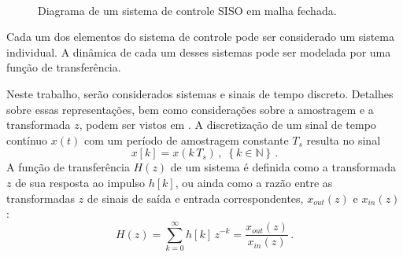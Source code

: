 \documentclass[repeatfields,oneside]{tcc}
\newcommand{\mycdot}{ \, }
\begin{document}
\begin{figure}[h]
    \centering
    \caption{Diagrama de um sistema de controle SISO em malha fechada.}
    \\
    \label{fig:control}
\end{figure}

Cada um dos elementos do sistema de controle pode ser considerado um sistema individual.
A dinâmica de cada um desses sistemas pode ser modelada por uma função de transferência.

Neste trabalho, serão considerados sistemas e sinais de tempo discreto.
Detalhes sobre essas representações, bem como considerações sobre a amostragem e a transformada $z$, podem ser vistos em \cite{Haykin2001, Astrom2011, Dorf2011}.
%
A discretização de um sinal de tempo contínuo $x(t)$ com um período de amostragem constante $T_s$ resulta no sinal
\begin{equation}\label{eq:sampling}
    x[k] = x(k \mycdot T_s)
    \,,\;
    \left\{ k \in \mathbb{N} \right\}
    \,.
\end{equation}
A função de transferência $H(z)$ de um sistema é definida como a transformada $z$ de sua resposta ao impulso $h[k]$, ou ainda como a razão entre as transformadas $z$ de sinais de saída e entrada correspondentes, $x_{out}(z)$ e $x_{in}(z)$:
\begin{equation}\label{eq:transfer_function}
    H(z) = \sum_{k = 0}^{\infty} h[k] \mycdot z^{-k}
         = \dfrac{ x_{out}(z) }{ x_{in}(z) }
    \,.
\end{equation}
\end{document}
